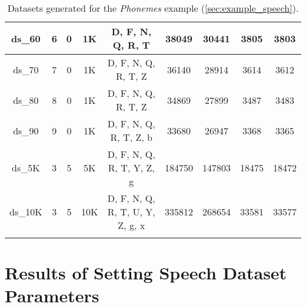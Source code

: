 \begin{footnotesize}
\begin{longtable}{|c|c|c|c|c|c|c|c|c|}
ds\_60      & 6           & 0           & 1K        & D, F, N, Q, R, T            & 38049         & 30441          & 3805           & 3803          \\ \hline
ds\_70      & 7           & 0           & 1K        & D, F, N, Q, R, T, Z         & 36140         & 28914          & 3614           & 3612          \\ \hline
ds\_80      & 8           & 0           & 1K        & D, F, N, Q, R, T, Z         & 34869         & 27899          & 3487           & 3483          \\ \hline
ds\_90      & 9           & 0           & 1K        & D, F, N, Q, R, T, Z, b      & 33680         & 26947          & 3368           & 3365          \\ \hline
ds\_5K      & 3           & 5           & 5K        & D, F, N, Q, R, T, Y, Z, g   & 184750        & 147803         & 18475          & 18472          \\ \hline
ds\_10K      & 3           & 5           & 10K      & D, F, N, Q, R, T, U, Y, Z, g, x & 335812    & 268654         & 33581          & 33577          \\ \hline
\caption{Datasets generated for the \textit{Phonemes} example (\cref{sec:example_speech}).} \label{tab:app:speech_datasets} \\
\end{longtable}
\end{footnotesize}

\section*{Results of Setting Speech Dataset Parameters} \label{app:sec:results_of_settings_speech_dataset_parameters}